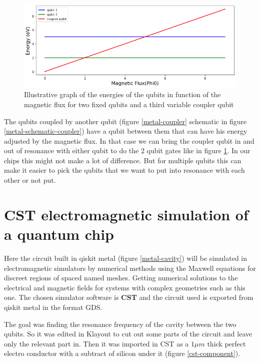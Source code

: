 \documentclass[12pt]{article}
\numberwithin{equation}{subsection}
\begin{document}
\begin{figure}[h]
\centering
\includegraphics[width=\maxwidth,height=\maxheight,keepaspectratio]{images/metal-graph-coupler-qubit.png}
\caption{Illustrative graph of the energies of the qubits in function of the magnetic flux for two fixed qubits and a third variable coupler qubit}
\label{metal-graph-coupler}
\end{figure}



The qubits coupled by another qubit (figure \ref{metal-coupler} schematic in figure \ref{metal-schematic-coupler}) have a qubit between them that can have his energy adjusted by the magnetic flux. In that case we can bring the coupler qubit in and out of resonance with either qubit to do the 2 qubit gates like in figure \ref{metal-graph-coupler}. In our chips this might not make a lot of difference. But for multiple qubits this can make it easier to pick the qubits that we want to put into resonance with each other or not put.

\clearpage

\section{CST electromagnetic simulation of a quantum chip}
Here the circuit built in qiskit metal (figure \ref{metal-cavity}) will be simulated in electromagnetic simulators by numerical methods using the Maxwell equations for discreet regions of spaced named meshes. Getting numerical solutions to the electrical and magnetic fields for systems with complex geometries such as this one. The chosen simulator software is \textbf{CST} and the circuit used is exported from qiskit metal in the format GDS. 

The goal was finding the resonance frequency of the cavity between the two qubits. So it was edited in Klayout to cut out some parts of the circuit and leave only the relevant part in. Then it was imported in CST as a $1\mu m$ thick perfect electro conductor with a subtract of silicon under it (figure \ref{cst-component}). 
\end{document}
